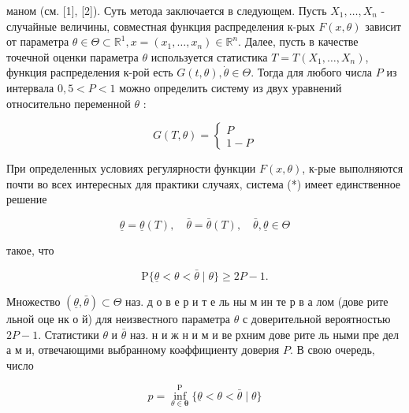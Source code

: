 \documentclass[10pt]{article}
\begin{document}
маном (см. [1], [2]). Суть метода заключается в следующем. Пусть $X_{1}, \ldots, X_{n}$ - случайные величины, совместная функция распределения к-рых $F(x, \theta)$ зависит от параметра $\theta \in \Theta \subset \mathbb{R}^{1}, x=\left(x_{1}, \ldots, x_{n}\right) \in \mathbb{R}^{n}$. Далее, пусть в качестве точечной оценки параметра $\theta$ используется статистика $T=T\left(X_{1}, \ldots, X_{n}\right)$, функция распределения к-рой есть $G(t, \theta), \dot{\theta} \in \mathcal{\Theta}$. Тогда для любого числа $P$ из интервала $0,5<P<1$ можно определить систему из двух уравнений относительно переменной $\theta$ :



\[

G(T, \theta)=\left\{\begin{array}{l}

P \\

1-P

\end{array}\right.

\]



При определенных условиях регулярности функции $F(x, \theta)$, к-рые выполняются почти во всех интересных для практики случаях, система (*) имеет единственное решение



\[

\underline{\theta}=\underline{\theta}(T), \quad \bar{\theta}=\bar{\theta}(T), \quad \bar{\theta}, \underline{\theta} \in \Theta

\]



такое, что



\[

\mathrm{P}\{\underline{\theta}<\theta<\bar{\theta} \mid \theta\} \geqslant 2 P-1 .

\]



Множество $(\underline{\theta}, \bar{\theta}) \subset \Theta$ наз. д о в е р и т е ль ны м ин те р в а лом (дове рите льной оце нк о й) для неизвестного параметра $\theta$ с доверительной вероятностью $2 P-1$. Статистики $\theta$ и $\bar{\theta}$ наз. н и ж н и м и ве рхним дове рите ль ными пре дел а м и, отвечающими выбранному коәффициенту доверия $P$. В свою очередь, число



\[

p=\inf _{\theta \in \boldsymbol{\theta}}^{\mathrm{P}}\{\underline{\theta}<\theta<\bar{\theta} \mid \theta\}

\]
\end{document}
